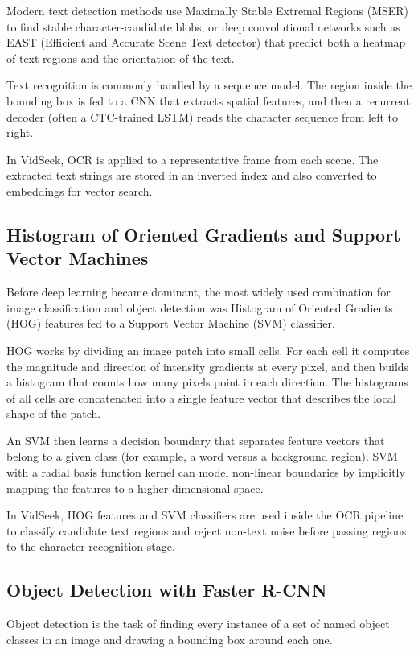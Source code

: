 \documentclass[12pt, a4paper]{report}
\begin{document}
Modern text detection methods use Maximally Stable Extremal Regions (MSER)
to find stable character-candidate blobs, or deep convolutional networks such
as EAST (Efficient and Accurate Scene Text detector) that predict both a
heatmap of text regions and the orientation of the text.

Text recognition is commonly handled by a sequence model. The region inside
the bounding box is fed to a CNN that extracts spatial features, and then
a recurrent decoder (often a CTC-trained LSTM) reads the character sequence
from left to right.

In VidSeek, OCR is applied to a representative frame from each scene. The
extracted text strings are stored in an inverted index and also converted
to embeddings for vector search.

\subsection{Histogram of Oriented Gradients and Support Vector Machines}

Before deep learning became dominant, the most widely used combination for
image classification and object detection was Histogram of Oriented Gradients
(HOG) features fed to a Support Vector Machine (SVM) classifier.

HOG works by dividing an image patch into small cells. For each cell it
computes the magnitude and direction of intensity gradients at every pixel,
and then builds a histogram that counts how many pixels point in each direction.
The histograms of all cells are concatenated into a single feature vector
that describes the local shape of the patch.

An SVM then learns a decision boundary that separates feature vectors that
belong to a given class (for example, a word versus a background region).
SVM with a radial basis function kernel can model non-linear boundaries by
implicitly mapping the features to a higher-dimensional space.

In VidSeek, HOG features and SVM classifiers are used inside the OCR pipeline
to classify candidate text regions and reject non-text noise before passing
regions to the character recognition stage.

\subsection{Object Detection with Faster R-CNN}

Object detection is the task of finding every instance of a set of named
object classes in an image and drawing a bounding box around each one.
\end{document}
